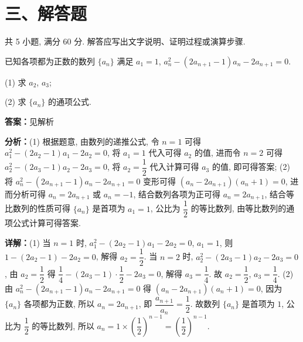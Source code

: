 \section*{三、解答题}
共 5 小题, 满分 60 分. 解答应写出文字说明、证明过程或演算步骤.

\begin{question}[points=12]
已知各项都为正数的数列 $\{a_n\}$ 满足 $a_1=1$, $a_n^2-(2a_{n+1}-1)a_n-2a_{n+1}=0$. 

(1) 求 $a_2$, $a_3$; 

(2) 求 $\{a_n\}$ 的通项公式.
\begin{solution}
\textbf{答案：}见解析

\textbf{分析：}(1) 根据题意, 由数列的递推公式, 令 $n=1$ 可得 $a_1^2-(2a_2-1)a_1-2a_2=0$, 将 $a_1=1$ 代入可得 $a_2$ 的值, 进而令 $n=2$ 可得 $a_2^2-(2a_3-1)a_2-2a_3=0$, 将 $a_2=\dfrac{1}{2}$ 代入计算可得 $a_3$ 的值, 即可得答案; (2) 将 $a_n^2-(2a_{n+1}-1)a_n-2a_{n+1}=0$ 变形可得 $(a_n-2a_{n+1})(a_n+1)=0$, 进而分析可得 $a_n=2a_{n+1}$ 或 $a_n=-1$, 结合数列各项为正可得 $a_n=2a_{n+1}$, 结合等比数列的性质可得 $\{a_n\}$ 是首项为 $a_1=1$, 公比为 $\dfrac{1}{2}$ 的等比数列, 由等比数列的通项公式计算可得答案.

\textbf{详解：}(1) 当 $n=1$ 时, $a_1^2-(2a_2-1)a_1-2a_2=0$, $a_1=1$, 则 $1-(2a_2-1)-2a_2=0$, 解得 $a_2=\dfrac{1}{2}$.
当 $n=2$ 时, $a_2^2-(2a_3-1)a_2-2a_3=0$, 由 $a_2=\dfrac{1}{2}$ 得 $\dfrac{1}{4}-(2a_3-1)\cdot\dfrac{1}{2}-2a_3=0$, 解得 $a_3=\dfrac{1}{4}$.
故 $a_2=\dfrac{1}{2}$, $a_3=\dfrac{1}{4}$.
(2) 由 $a_n^2-(2a_{n+1}-1)a_n-2a_{n+1}=0$ 得 $(a_n-2a_{n+1})(a_n+1)=0$, 因为 $\{a_n\}$ 各项都为正数, 所以 $a_n=2a_{n+1}$, 即 $\dfrac{a_{n+1}}{a_n}=\dfrac{1}{2}$. 故数列 $\{a_n\}$ 是首项为 $1$, 公比为 $\dfrac{1}{2}$ 的等比数列, 所以 $a_n=1\times\left(\dfrac{1}{2}\right)^{n-1}=\left(\dfrac{1}{2}\right)^{n-1}$.
\end{solution}
\end{question}

